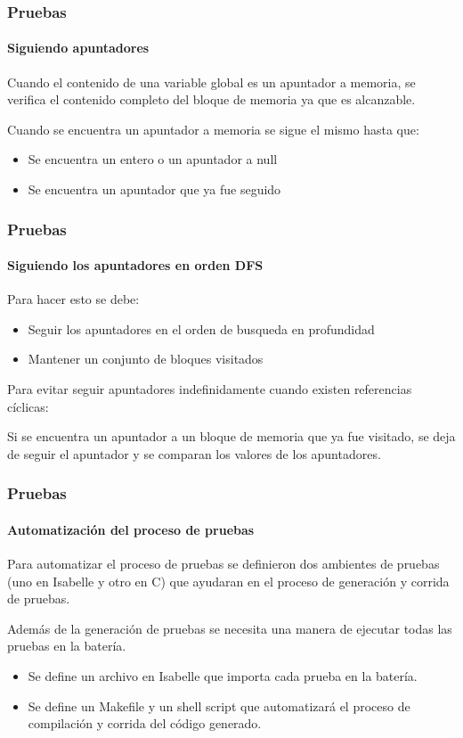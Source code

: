 \begin{frame}
\frametitle{Pruebas}
\framesubtitle{Siguiendo apuntadores}

Cuando el contenido de una variable global es un apuntador a memoria, se verifica el contenido completo del bloque de memoria ya que es alcanzable.
\bigskip
\pause

Cuando se encuentra un apuntador a memoria se sigue el mismo hasta que:
\begin{itemize}
\item{Se encuentra un entero o un apuntador a null}
\item{Se encuentra un apuntador que ya fue seguido}
\end{itemize}
\bigskip

\end{frame}


\begin{frame}
\frametitle{Pruebas}
\framesubtitle{Siguiendo los apuntadores en orden DFS}

Para hacer esto se debe:
\begin{itemize}
\item{Seguir los apuntadores en el orden de busqueda en profundidad}
\item{Mantener un conjunto de bloques visitados}
\end{itemize}


Para evitar seguir apuntadores indefinidamente cuando existen referencias cíclicas:

Si se encuentra un apuntador a un bloque de memoria que ya fue visitado, se deja de seguir el apuntador y se comparan los valores de los apuntadores.

\end{frame}


\begin{frame}
\frametitle{Pruebas}
\framesubtitle{Automatización del proceso de pruebas}

Para automatizar el proceso de pruebas se definieron dos ambientes de pruebas (uno en Isabelle y otro en C) que ayudaran en el proceso de generación y corrida de pruebas.
\bigskip
\pause

Además de la generación de pruebas se necesita una manera de ejecutar todas las pruebas en la batería.
\pause
\bigskip

\begin{itemize}
\item{Se define un archivo en Isabelle que importa cada prueba en la batería.}
\item{Se define un Makefile y un shell script que automatizará el proceso de compilación y corrida del código generado.}
\end{itemize}

\end{frame}
